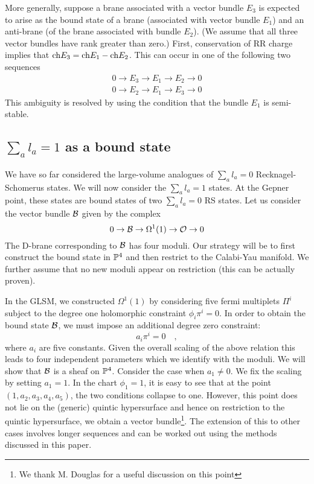 \documentclass[a4paper,12pt]{article}
\begin{document}
More generally, suppose a brane associated with
a vector bundle $E_3$ is expected to arise as the
bound state of a brane (associated with vector bundle $E_1$)
 and an anti-brane (of the brane associated with bundle $E_2$).
(We assume that all three vector bundles have rank greater than
zero.)
First, conservation of RR charge implies that ${\rm ch} E_3
= {\rm ch} E_1 - {\rm ch} E_2$. This can occur in one of the following
two sequences
\begin{eqnarray*}
0 \rightarrow E_3 \rightarrow E_1 \rightarrow E_2 \rightarrow 0 \\
0 \rightarrow E_2 \rightarrow E_1 \rightarrow E_3 \rightarrow 0 
\end{eqnarray*}
This ambiguity is resolved by using the condition that the bundle $E_1$
is semi-stable\cite{bpsalgebra}.

\subsection{$\sum_a l_a =1$ as a bound state}
We have so far considered the large-volume analogues of $\sum_a l_a=0$
Recknagel-Schomerus states\cite{quintic}. We will now consider the
$\sum_a l_a=1$ states. At the Gepner point, these states are bound states
of two $\sum_a l_a=0$ RS states. Let us consider the vector bundle
${\cal B}$ given by the complex
\begin{equation}
0\rightarrow {\cal B} \rightarrow \Omega^1(1) \rightarrow {\cal O}
\rightarrow 0
\end{equation}
The D-brane corresponding to ${\cal B}$ has four moduli. Our strategy will
be to first construct the bound state in $\mathbb P^4$ and then restrict to the
Calabi-Yau manifold. We further assume that no new moduli appear on
restriction (this can be actually proven).

In the GLSM, we constructed $\Omega^1(1)$ by considering five fermi 
multiplets $\Pi^i$ subject to the degree one holomorphic constraint $\phi_i
\pi^i=0$. In order to obtain the bound state ${\cal B}$, we must
impose an additional degree zero constraint:
\begin{equation}
a_i \pi^i =0\quad,
\end{equation}
where $a_i$ are five constants.  Given the overall scaling of the above
relation this leads to four independent parameters which we identify
with the moduli. We will show that ${\cal B}$ is a sheaf on $\mathbb P^4$.
Consider the case when $a_1\neq0$. We fix the scaling by setting
$a_1=1$. In the chart $\phi_1=1$, it is easy to see that at the point
$(1,a_2,a_3,a_4,a_5)$, the two conditions collapse to one. However,
this point does not lie on the (generic) quintic hypersurface and hence
on restriction to the quintic hypersurface, we obtain a vector
bundle\footnote{We thank M. Douglas for a useful discussion on this
point}. The extension of this to other cases involves longer sequences
and can be worked out using the methods discussed in this paper.
\end{document}
